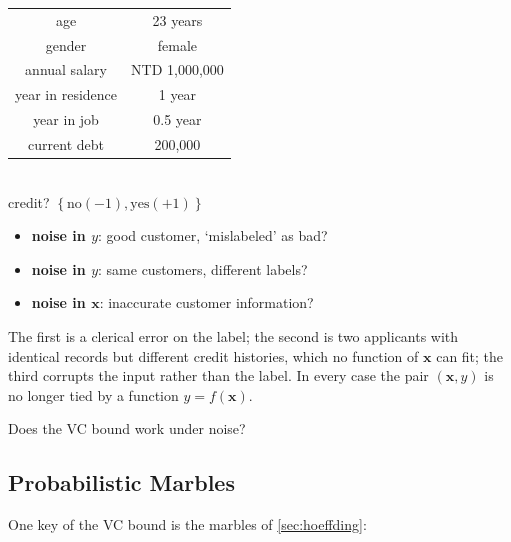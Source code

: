 \begin{center}
    \begin{minipage}[c]{0.4\textwidth}
        \centering
        \small
        \begin{tabular}{@{}|c|c|@{}}
            \hline
            age & 23 years\\
            gender & female\\
            annual salary & NTD 1,000,000\\
            year in residence & 1 year\\
            year in job & 0.5 year\\
            current debt & 200,000\\
            \hline
        \end{tabular}\\[3pt]
        credit? \(\left\{ \text{no}(-1), \text{yes}(+1) \right\}\)
    \end{minipage}%
    \begin{minipage}[c]{0.55\textwidth}
        \begin{itemize}
            \item \textbf{noise in \(y\)}: good customer, `mislabeled' as bad?
            \item \textbf{noise in \(y\)}: same customers, different labels?
            \item \textbf{noise in \(\bm{x}\)}: inaccurate customer
                information?
        \end{itemize}
    \end{minipage}
\end{center}

The first is a clerical error on the label; the second is two applicants with
identical records but different credit histories, which no function of
\(\bm{x}\) can fit; the third corrupts the input rather than the label. In
every case the pair \((\bm{x}, y)\) is no longer tied by a function \(y =
f(\bm{x})\).

\begin{question}
    Does the VC bound work under noise?
\end{question}

\subsection{Probabilistic Marbles}

One key of the VC bound is the marbles of \autoref{sec:hoeffding}:

